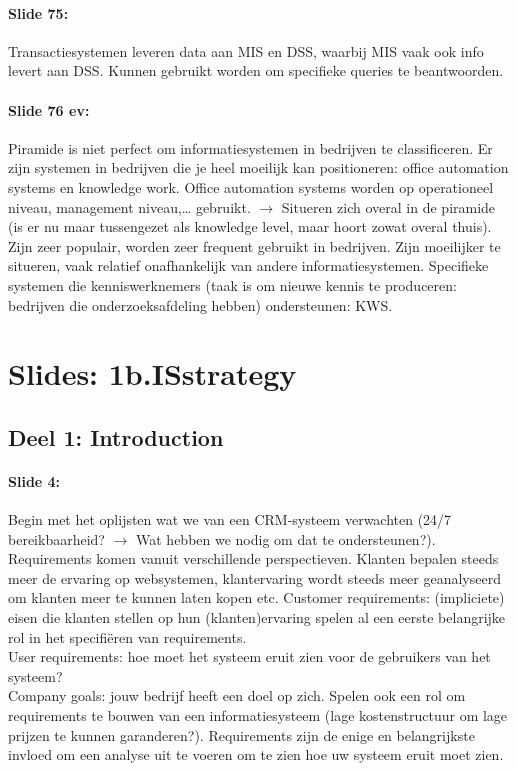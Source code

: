 \documentclass[10pt,a4paper]{report}
\begin{document}
\paragraph{Slide 75:}Transactiesystemen leveren data aan MIS en DSS, waarbij MIS vaak ook info levert aan DSS. Kunnen gebruikt worden om specifieke queries te beantwoorden.

\paragraph{Slide 76 ev:}Piramide is niet perfect om informatiesystemen in bedrijven te classificeren. Er zijn systemen in bedrijven die je heel moeilijk kan positioneren: office automation systems en knowledge work. Office automation systems worden op operationeel niveau, management niveau,… gebruikt. $\rightarrow$ Situeren zich overal in de piramide (is er nu maar tussengezet als knowledge level, maar hoort zowat overal thuis). Zijn zeer populair, worden zeer frequent gebruikt in bedrijven. Zijn moeilijker te situeren, vaak relatief onafhankelijk van andere informatiesystemen. Specifieke systemen die kenniswerknemers (taak is om nieuwe kennis te produceren: bedrijven die onderzoeksafdeling hebben) ondersteunen: KWS.

\section{Slides: 1b.ISstrategy}
\subsection{Deel 1: Introduction}
\paragraph{Slide 4:}Begin met het oplijsten wat we van een CRM-systeem verwachten (24/7 bereikbaarheid? $\rightarrow$ Wat hebben we nodig om dat te ondersteunen?). Requirements komen vanuit verschillende perspectieven. Klanten bepalen steeds meer de ervaring op websystemen, klantervaring wordt steeds meer geanalyseerd om klanten meer te kunnen laten kopen etc. Customer requirements: (impliciete) eisen die klanten stellen op hun (klanten)ervaring spelen al een eerste belangrijke rol in het specifiëren van requirements.\\
User requirements: hoe moet het systeem eruit zien voor de gebruikers van het systeem?\\
Company goals: jouw bedrijf heeft een doel op zich. Spelen ook een rol om requirements te bouwen van een informatiesysteem (lage kostenstructuur om lage prijzen te kunnen garanderen?).
Requirements zijn de enige en belangrijkste invloed om een analyse uit te voeren om te zien hoe uw systeem eruit moet zien.
\end{document}
